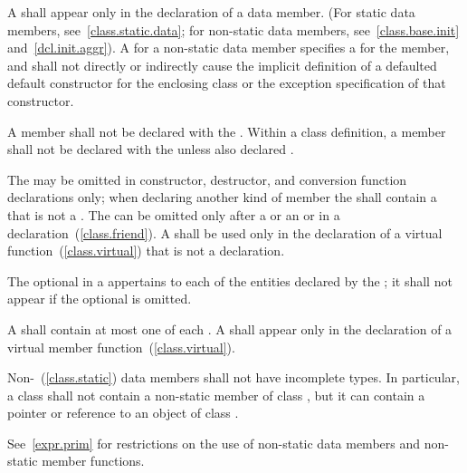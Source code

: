 \pnum
A  shall appear only in the
declaration of a data member. (For static data members,
see~\ref{class.static.data}; for non-static data members,
see~\ref{class.base.init} and~\ref{dcl.init.aggr}).
A  for a non-static data member
%
specifies a  for the member, and
shall not directly or indirectly cause the implicit definition of a
defaulted default constructor for the enclosing class or the
exception specification of that constructor.

\pnum
A member shall not be declared with the 
. Within a class definition, a member shall not be declared with the   unless also declared .

\pnum
The  may be omitted in constructor, destructor,
and conversion function declarations only;
when declaring another kind of member the 
shall contain a  that is not a .
The
 can be omitted only after a
 or an  or in a
 declaration~(\ref{class.friend}). A
 shall be used only in the declaration of a
virtual function~(\ref{class.virtual})
that is not a  declaration.

\pnum
The optional  in a 
appertains to each of the entities declared by the ;
it shall not appear if the optional  is omitted.

\pnum
A  shall contain at most one of each
.
A 
shall appear only in the declaration of a virtual member
function~(\ref{class.virtual}).

\pnum
{}%
Non-~(\ref{class.static}) data members shall not have
incomplete types. In particular, a class  shall not contain a
non-static member of class , but it can contain a pointer or
reference to an object of class .

\pnum
\enternote
See~\ref{expr.prim} for restrictions on the use of non-static data
members and non-static member functions.
\exitnote

